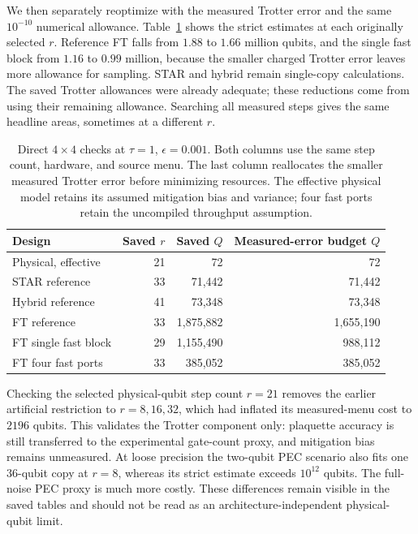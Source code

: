 \documentclass[11pt]{article}
\newcommand{\eps}{\epsilon}
\begin{document}
We then separately reoptimize with the measured Trotter error and the same
$10^{-10}$ numerical allowance. Table~\ref{tab:direct-budgets} shows the
strict estimates at each originally selected $r$. Reference FT falls from
$1.88$ to $1.66$ million qubits, and the single fast block from $1.16$ to
$0.99$ million, because the smaller charged Trotter error leaves more
allowance for sampling. STAR and hybrid remain single-copy calculations.
The saved Trotter allowances were already adequate; these reductions come
from using their remaining allowance. Searching all measured steps gives the
same headline areas, sometimes at a different $r$.

\begin{table}[t]
\centering
\begin{tabular}{lrrr}
\toprule
Design & Saved $r$ & Saved $Q$ & Measured-error budget $Q$ \\
\midrule
Physical, effective & 21 & 72 & 72 \\
STAR reference & 33 & 71,442 & 71,442 \\
Hybrid reference & 41 & 73,348 & 73,348 \\
FT reference & 33 & 1,875,882 & 1,655,190 \\
FT single fast block & 29 & 1,155,490 & 988,112 \\
FT four fast ports & 33 & 385,052 & 385,052 \\
\bottomrule
\end{tabular}
\caption{Direct $4\times4$ checks at $\tau=1$, $\eps=0.001$. Both
columns use the same step count, hardware, and source menu. The last
column reallocates the smaller measured Trotter error before minimizing
resources. The effective physical model retains its assumed mitigation bias and variance;
four fast ports retain the uncompiled throughput assumption.}
\label{tab:direct-budgets}
\end{table}

Checking the selected physical-qubit step count $r=21$ removes the earlier artificial
restriction to $r=8,16,32$, which had inflated its measured-menu cost to
$2196$ qubits. This validates the Trotter component only: plaquette accuracy
is still transferred to the experimental gate-count proxy, and mitigation
bias remains unmeasured. At loose precision the two-qubit PEC scenario also
fits one $36$-qubit copy at $r=8$, whereas its strict estimate exceeds
$10^{12}$ qubits. The full-noise PEC proxy is much more costly. These
differences remain visible in the saved tables and should not be read as
an architecture-independent physical-qubit limit.
\end{document}
